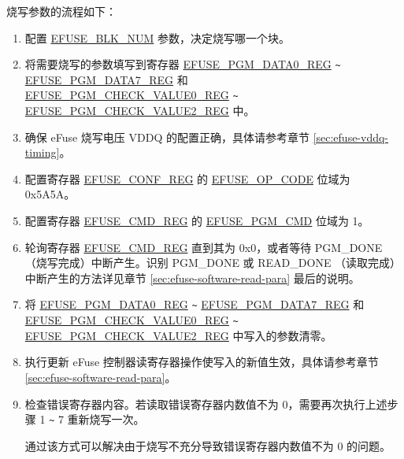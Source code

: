 \documentclass[main\_\_CN.tex]{subfiles}
\begin{document}
烧写参数的流程如下：
\begin{enumerate}
\item 配置 \hyperref[fielddesc:EFUSEBLKNUM]{EFUSE\_BLK\_NUM} 参数，决定烧写哪一个块。

\item 将需要烧写的参数填写到寄存器 \hyperref[regdesc:EFUSEPGMDATA0REG]{EFUSE\_PGM\_DATA0\_REG} \verb+~+ \hyperref[regdesc:EFUSEPGMDATA7REG]{EFUSE\_PGM\_DATA7\_REG} 和\\ \hyperref[regdesc:EFUSEPGMCHECKVALUE0REG]{EFUSE\_PGM\_CHECK\_VALUE0\_REG}  \verb+~+  \hyperref[regdesc:EFUSEPGMCHECKVALUE2REG]{EFUSE\_PGM\_CHECK\_VALUE2\_REG} 中。


\item 确保 eFuse 烧写电压 VDDQ 的配置正确，具体请参考章节 \ref{sec:efuse-vddq-timing}。

\item 配置寄存器 \hyperref[regdesc:EFUSECONFREG]{EFUSE\_CONF\_REG} 的 \hyperref[fielddesc:EFUSEOPCODE]{EFUSE\_OP\_CODE} 位域为 0x5A5A。

\item 配置寄存器 \hyperref[regdesc:EFUSECMDREG]{EFUSE\_CMD\_REG} 的 \hyperref[fielddesc:EFUSEPGMCMD]{EFUSE\_PGM\_CMD} 位域为 1。

\item 轮询寄存器 \hyperref[regdesc:EFUSECMDREG]{EFUSE\_CMD\_REG} 直到其为 0x0，或者等待 PGM\_DONE（烧写完成）中断产生。识别 PGM\_DONE 或 READ\_DONE （读取完成）中断产生的方法详见章节 \ref{sec:efuse-software-read-para} 最后的说明。

\item 将 \hyperref[regdesc:EFUSEPGMDATA0REG]{EFUSE\_PGM\_DATA0\_REG} \verb+~+ \hyperref[regdesc:EFUSEPGMDATA7REG]{EFUSE\_PGM\_DATA7\_REG} 和\\ \hyperref[regdesc:EFUSEPGMCHECKVALUE0REG]{EFUSE\_PGM\_CHECK\_VALUE0\_REG}  \verb+~+  \hyperref[regdesc:EFUSEPGMCHECKVALUE2REG]{EFUSE\_PGM\_CHECK\_VALUE2\_REG} 中写入的参数清零。

\item 执行更新 eFuse 控制器读寄存器操作使写入的新值生效，具体请参考章节 \ref{sec:efuse-software-read-para}。
\item 检查错误寄存器内容。若读取错误寄存器内数值不为 0，需要再次执行上述步骤 1 \verb+~+ 7 重新烧写一次。

通过该方式可以解决由于烧写不充分导致错误寄存器内数值不为 0 的问题。


\end{enumerate}
\end{document}
